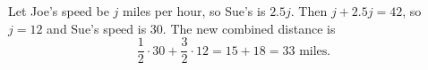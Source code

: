 Let Joe's speed be $j$ miles per hour, so Sue's is $2.5j$. Then $j+2.5j=42$, so $j=12$ and Sue's speed is $30$. The new combined distance is
\[
\dfrac{1}{2}\cdot30+\dfrac{3}{2}\cdot12=15+18=\boxed{33}\text{ miles}.
\]
